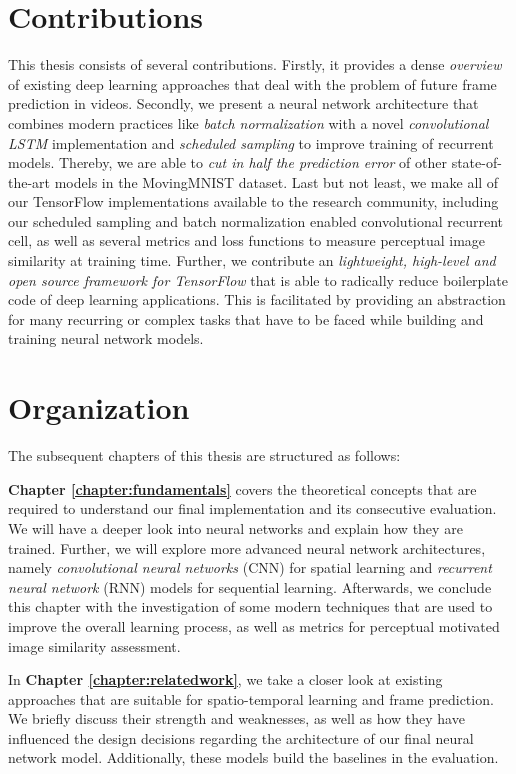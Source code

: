 \section{Contributions}

This thesis consists of several contributions. Firstly, it provides a dense \textit{overview} of existing deep learning approaches that deal with the problem of future frame prediction in videos. Secondly, we present a neural network architecture that combines modern practices like \textit{batch normalization} with a novel \textit{convolutional LSTM} implementation and \textit{scheduled sampling} to improve training of recurrent models. Thereby, we are able to \textit{cut in half the prediction error} of other state-of-the-art models in the MovingMNIST dataset. Last but not least, we make all of our TensorFlow implementations available to the research community, including our scheduled sampling and batch normalization enabled convolutional recurrent cell, as well as several metrics and loss functions to measure perceptual image similarity at training time. Further, we contribute an \textit{lightweight, high-level and open source framework for TensorFlow} that is able to radically reduce boilerplate code of deep learning applications. This is facilitated by providing an abstraction for many recurring or complex tasks that have to be faced while building and training neural network models.


\section{Organization}

The subsequent chapters of this thesis are structured as follows:

\textbf{Chapter \ref{chapter:fundamentals}} covers the theoretical concepts that are required to understand our final implementation and its consecutive evaluation. We will have a deeper look into neural networks and explain how they are trained. Further, we will explore more advanced neural network architectures, namely \textit{convolutional neural networks} (CNN) for spatial learning and \textit{recurrent neural network} (RNN) models for sequential learning. Afterwards, we conclude this chapter with the investigation of some modern techniques that are used to improve the overall learning process, as well as metrics for perceptual motivated image similarity assessment.

In \textbf{Chapter \ref{chapter:relatedwork}}, we take a closer look at existing approaches that are suitable for spatio-temporal learning and frame prediction. We briefly discuss their strength and weaknesses, as well as how they have influenced the design decisions regarding the architecture of our final neural network model. Additionally, these models build the baselines in the evaluation.


